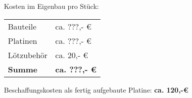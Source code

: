 \par\bigskip
Kosten im Eigenbau pro Stück:
\par\bigskip


\begin{tabularx}{\textwidth} {@{\hspace{1cm}}lX@{}}
    Bauteile & ca. ???,- € \\
    Platinen & ca. ???,- €\\
    Lötzubehör & ca. 20,- € \\
    \textbf{Summe} & \textbf{ca. ???,- €} \\
\end{tabularx}

\par\bigskip
Beschaffungskosten als fertig aufgebaute Platine: \textbf{ca. 120,-€}
